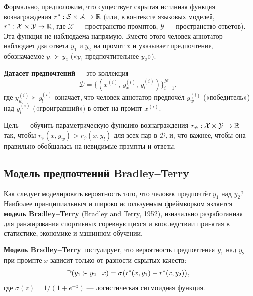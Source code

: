 Формально, предположим, что существует скрытая истинная функция вознаграждения $r^* : \mathcal{S} \times \mathcal{A} \to \mathbb{R}$ (или, в контексте языковых моделей, $r^* : \mathcal{X} \times \mathcal{Y} \to \mathbb{R}$, где $\mathcal{X}$ --- пространство промптов, $\mathcal{Y}$ --- пространство ответов). Эта функция не наблюдаема напрямую. Вместо этого человек-аннотатор наблюдает два ответа $y_1$ и $y_2$ на промпт $x$ и указывает предпочтение, обозначаемое $y_1 \succ y_2$ («$y_1$ предпочтительнее $y_2$»).

\begin{definition}
\label{def:preference-dataset}
\textbf{Датасет предпочтений} --- это коллекция
\[
\mathcal{D} = \bigl\{(x^{(i)},\, y_w^{(i)},\, y_l^{(i)})\bigr\}_{i=1}^{N},
\]
где $y_w^{(i)} \succ y_l^{(i)}$ означает, что человек-аннотатор предпочёл $y_w^{(i)}$ («победитель») над $y_l^{(i)}$ («проигравший») в ответ на промпт $x^{(i)}$.
\end{definition}

Цель --- обучить параметрическую функцию вознаграждения $r_\psi : \mathcal{X} \times \mathcal{Y} \to \mathbb{R}$ так, чтобы $r_\psi(x, y_w) > r_\psi(x, y_l)$ для всех пар в $\mathcal{D}$, и, что важнее, чтобы она правильно обобщалась на невидимые промпты и ответы.

\subsection{Модель предпочтений Bradley--Terry}

Как следует моделировать вероятность того, что человек предпочтёт $y_1$ над $y_2$? Наиболее принципиальным и широко используемым фреймворком является \textbf{модель Bradley--Terry} (Bradley and Terry, 1952), изначально разработанная для ранжирования спортивных соревнующихся и впоследствии принятая в статистике, экономике и машинном обучении.

\begin{definition}
\label{def:bt-model}
\textbf{Модель Bradley--Terry} постулирует, что вероятность предпочтения $y_1$ над $y_2$ при промпте $x$ зависит только от разности скрытых качеств:
\begin{equation}
\label{eq:bt-model}
\mathbb{P}(y_1 \succ y_2 \mid x) = \sigma\bigl(r^*(x, y_1) - r^*(x, y_2)\bigr),
\end{equation}
где $\sigma(z) = 1/(1 + e^{-z})$ --- логистическая сигмоидная функция.
\end{definition}

